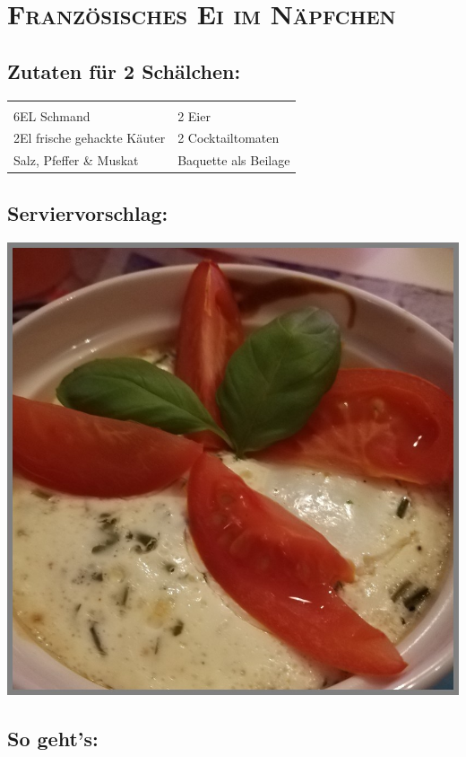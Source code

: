 \section{\textsc{Französisches Ei im Näpfchen}}

\subsection*{Zutaten für 2 Schälchen:}

\begin{tabular}{p{7.5cm} p{7.5cm}}
	& \\
	6EL Schmand & 2 Eier \\
	2El frische gehackte Käuter & 2 Cocktailtomaten \\
  Salz, Pfeffer \& Muskat & Baquette als Beilage
\end{tabular}

\subsection*{Serviervorschlag:}

\includegraphics[width=\textwidth]{img/ei_naepfchen_franz.jpg} \cite{eiimnaepfchenfranz}

\subsection*{So geht's:}

